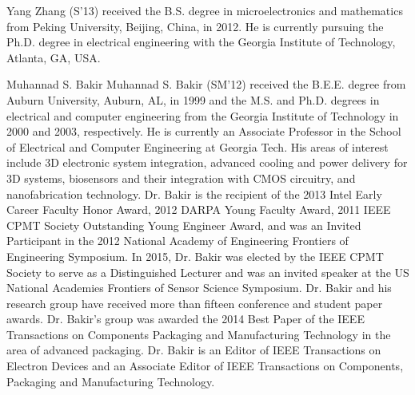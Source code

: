 \documentclass[journal,twoside]{IEEEtran}
\begin{document}
\vspace{-0.3in}


\begin{IEEEbiography}%
{Yang Zhang}
(S'13) received the B.S. degree
in microelectronics and mathematics from Peking
University, Beijing, China, in 2012. He is currently
pursuing the Ph.D. degree in electrical engineering
with the Georgia Institute of Technology, Atlanta,
GA, USA.
\end{IEEEbiography}

\vspace{-0.3in}


\begin{IEEEbiography}%
{Muhannad S. Bakir}
Muhannad S. Bakir (SM'12) received the B.E.E. degree from Auburn University, Auburn, AL, in 1999 and the M.S. 
and Ph.D. degrees in electrical and computer engineering from the Georgia Institute of Technology
in 2000 and 2003, respectively. 
He is currently an Associate Professor in the School of Electrical and Computer Engineering at Georgia Tech. 
His areas of interest include 3D electronic system integration, advanced cooling and power 
delivery for 3D systems, biosensors and their integration with CMOS circuitry, and nanofabrication technology. 
Dr. Bakir is the recipient of the 2013 Intel Early Career Faculty Honor Award, 2012 DARPA Young Faculty Award, 
2011 IEEE CPMT Society Outstanding Young Engineer Award, and was an Invited Participant in the 2012 National 
Academy of Engineering Frontiers of Engineering Symposium. In 2015, Dr. Bakir was elected by the IEEE CPMT 
Society to serve as a Distinguished Lecturer and was an invited speaker at the US National Academies Frontiers 
of Sensor Science Symposium. Dr. Bakir and his research group have received more than fifteen conference and 
student paper awards.
Dr. Bakir's group was awarded the 2014 Best Paper of the IEEE Transactions on 
Components Packaging and Manufacturing Technology in the area of advanced packaging. 
Dr. Bakir is an Editor of IEEE Transactions on Electron Devices and an Associate Editor of IEEE Transactions 
on Components, Packaging and Manufacturing Technology. 
\end{IEEEbiography}


\vfill
\end{document}
